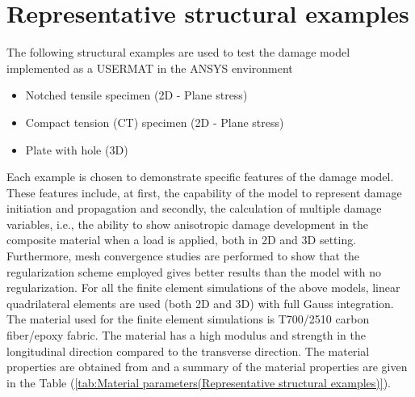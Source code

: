 \documentclass[12pt,a4paper,twoside,openright]{report}
\begin{document}
\section{Representative structural examples}
\indent\indent\indent The following structural examples are used to test the damage model implemented as a USERMAT in the ANSYS environment
\begin{itemize}
\item Notched tensile specimen (2D - Plane stress)
\item Compact tension (CT) specimen (2D - Plane stress)
\item Plate with hole (3D)
\end{itemize}
Each example is chosen to demonstrate specific features of the damage model. These features include, at first, the capability of the model to represent damage initiation and propagation and secondly, the calculation of multiple damage variables, i.e., the ability to show anisotropic damage development in the composite material when a load is applied, both in 2D and 3D setting. Furthermore, mesh convergence studies are performed to show that the regularization scheme employed gives better results than the model with no regularization. For all the finite element simulations of the above models, linear quadrilateral elements are used (both 2D and 3D) with full Gauss integration. The material used for the finite element simulations is T700/2510 carbon fiber/epoxy fabric. The material has a high modulus and strength in the longitudinal direction compared to the transverse direction. The material properties are obtained from \citep{jiang2018evaluations} and a summary of the material properties are given in the Table (\ref{tab:Material parameters(Representative structural examples)}). \\
\end{document}
